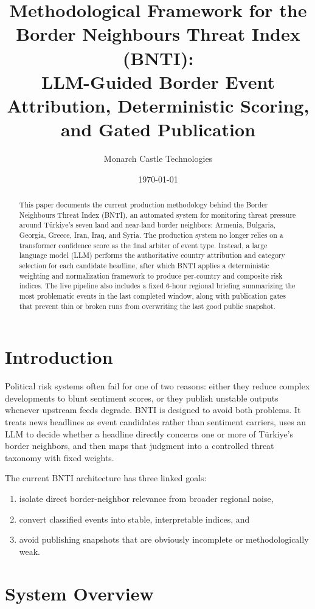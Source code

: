 \documentclass[11pt, a4paper]{article}
\title{Methodological Framework for the Border Neighbours Threat Index (BNTI):\\
LLM-Guided Border Event Attribution, Deterministic Scoring, and Gated Publication}
\author{Monarch Castle Technologies}
\date{\today}
\begin{document}
\maketitle

\begin{abstract}
This paper documents the current production methodology behind the Border Neighbours Threat Index (BNTI), an automated system for monitoring threat pressure around Türkiye's seven land and near-land border neighbors: Armenia, Bulgaria, Georgia, Greece, Iran, Iraq, and Syria. The production system no longer relies on a transformer confidence score as the final arbiter of event type. Instead, a large language model (LLM) performs the authoritative country attribution and category selection for each candidate headline, after which BNTI applies a deterministic weighting and normalization framework to produce per-country and composite risk indices. The live pipeline also includes a fixed 6-hour regional briefing summarizing the most problematic events in the last completed window, along with publication gates that prevent thin or broken runs from overwriting the last good public snapshot.
\end{abstract}

\section{Introduction}
Political risk systems often fail for one of two reasons: either they reduce complex developments to blunt sentiment scores, or they publish unstable outputs whenever upstream feeds degrade. BNTI is designed to avoid both problems. It treats news headlines as event candidates rather than sentiment carriers, uses an LLM to decide whether a headline directly concerns one or more of Türkiye's border neighbors, and then maps that judgment into a controlled threat taxonomy with fixed weights.

The current BNTI architecture has three linked goals:
\begin{enumerate}
    \item isolate direct border-neighbor relevance from broader regional noise,
    \item convert classified events into stable, interpretable indices, and
    \item avoid publishing snapshots that are obviously incomplete or methodologically weak.
\end{enumerate}

\section{System Overview}
\end{document}
